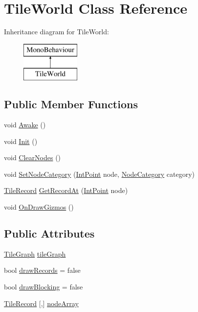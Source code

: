 \hypertarget{class_tile_world}{}\section{Tile\+World Class Reference}
\label{class_tile_world}
Inheritance diagram for Tile\+World\+:\begin{figure}[H]
\begin{center}
\leavevmode
\includegraphics[height=2.000000cm]{class_tile_world}
\end{center}
\end{figure}
\subsection*{Public Member Functions}
\begin{DoxyCompactItemize}
\item 
void \mbox{\hyperlink{class_tile_world_ac42e3485b2e38601dd47dcb12b5af1d8}{Awake}} ()
\item 
void \mbox{\hyperlink{class_tile_world_ad236fe1c3f6a9f3bd6f1811962e8d849}{Init}} ()
\item 
void \mbox{\hyperlink{class_tile_world_a1888b1fe49ca8b7a58b982cb25ddd7f0}{Clear\+Nodes}} ()
\item 
void \mbox{\hyperlink{class_tile_world_a377f2b3e756ec6d9eee11fad9fb3688f}{Set\+Node\+Category}} (\mbox{\hyperlink{struct_int_point}{Int\+Point}} node, \mbox{\hyperlink{_graph_types_8cs_aeaefcb909e173fc6cbac62eca33b14f9}{Node\+Category}} category)
\item 
\mbox{\hyperlink{struct_tile_record}{Tile\+Record}} \mbox{\hyperlink{class_tile_world_aeeb99a43018c8bcbc49054e248429291}{Get\+Record\+At}} (\mbox{\hyperlink{struct_int_point}{Int\+Point}} node)
\item 
void \mbox{\hyperlink{class_tile_world_ad06ad6b7b31c633d59cd494747070d9b}{On\+Draw\+Gizmos}} ()
\end{DoxyCompactItemize}
\subsection*{Public Attributes}
\begin{DoxyCompactItemize}
\item 
\mbox{\hyperlink{class_tile_graph}{Tile\+Graph}} \mbox{\hyperlink{class_tile_world_af281625545d4b1aaeaf5053a62b1d519}{tile\+Graph}}
\item 
bool \mbox{\hyperlink{class_tile_world_af3b21e656a6ba363f41fe128a7e02be2}{draw\+Records}} = false
\item 
bool \mbox{\hyperlink{class_tile_world_abcf86ec3be82b6a58b64f7dad278b1e0}{draw\+Blocking}} = false
\item 
\mbox{\hyperlink{struct_tile_record}{Tile\+Record}} \mbox{[},\mbox{]} \mbox{\hyperlink{class_tile_world_a8f7c8f36d84d1bd4086078e690a08ce3}{node\+Array}}
\end{DoxyCompactItemize}


